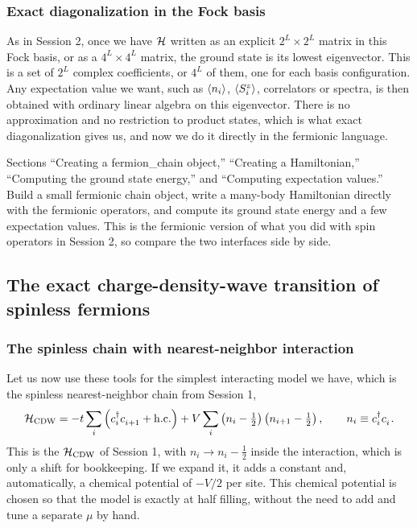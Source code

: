 \documentclass[lecture_notes.tex]{subfiles}
\begin{document}
\subsubsection{Exact diagonalization in the Fock basis}
As in Session 2, once we have $\mathcal{H}$ written as an explicit $2^L\times2^L$ matrix in this Fock
basis, or as a $4^L\times4^L$ matrix, the ground state is its lowest eigenvector. This is a set of
$2^L$ complex coefficients, or $4^L$ of them, one for each basis configuration. Any expectation
value we want, such as $\expval{n_i}$, $\expval{S_i^z}$, correlators or spectra, is then obtained
with ordinary linear algebra on this eigenvector. There is no approximation and no restriction to
product states, which is what exact diagonalization gives us, and now we do it directly in the
fermionic language.

\begin{notebook}
Sections ``Creating a fermion\_chain object,'' ``Creating a Hamiltonian,'' ``Computing the ground
state energy,'' and ``Computing expectation values.'' Build a small fermionic chain object, write
a many-body Hamiltonian directly with the fermionic operators, and compute its ground state energy
and a few expectation values. This is the fermionic version of what you did with spin operators in
Session 2, so compare the two interfaces side by side.
\end{notebook}

\subsection{The exact charge-density-wave transition of spinless fermions}
\label{sec:cdwexact}
\subsubsection{The spinless chain with nearest-neighbor interaction}
Let us now use these tools for the simplest interacting model we have, which is the spinless
nearest-neighbor chain from Session 1,
\begin{equation}
  \Ham_{\mathrm{CDW}} = -t\sum_i\left(\cre{i}\ann{i+1} + \mathrm{h.c.}\right)
    + V\sum_i \left(n_i - \tfrac12\right)\left(n_{i+1} - \tfrac12\right), \qquad n_i \equiv
    \cre{i}\ann{i}.
  \label{eq:cdw3}
\end{equation}
This is the $\mathcal{H}_{\mathrm{CDW}}$ of Session 1, with $n_i \to n_i - \tfrac12$ inside the
interaction, which is only a shift for bookkeeping. If we expand it, it adds a constant and,
automatically, a chemical potential of $-V/2$ per site. This chemical potential is chosen so that
the model is exactly at half filling, without the need to add and tune a separate $\mu$ by hand.
\end{document}
